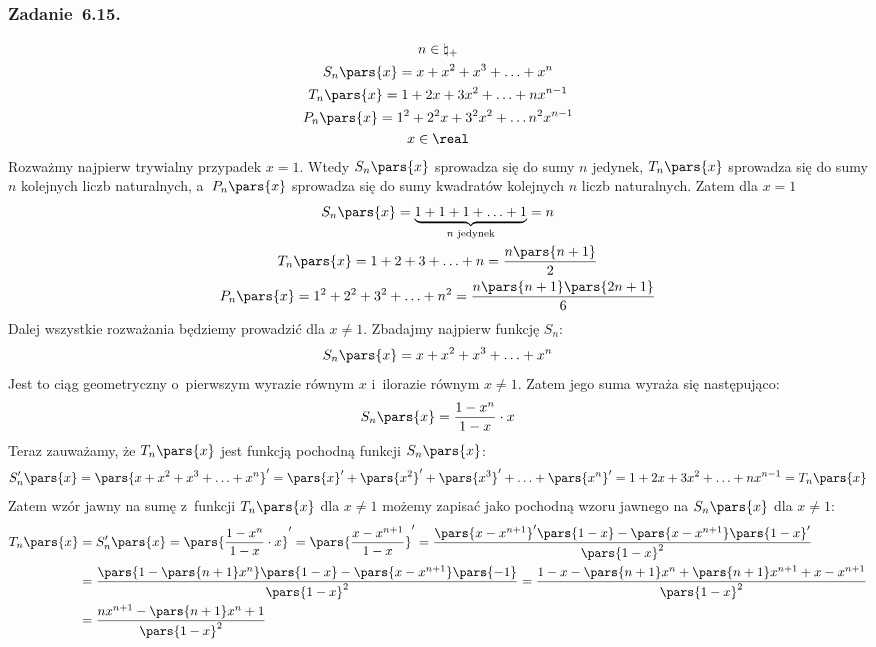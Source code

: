 \subsubsection*{Zadanie~6.15.}
\begin{gather*}
    n \in \natural_+\\
    S_n\pars{x} = x + x^2 + x^3 + \ldots + x^n\\
    T_n\pars{x} = 1 + 2x + 3x^2 + \ldots + nx^{n - 1}\\
    P_n\pars{x} = 1^2 + 2^2x + 3^2x^2 + \ldots n^2x^{n - 1}\\
    x \in \real
\end{gather*}
Rozważmy najpierw trywialny przypadek \(x = 1\). Wtedy \(S_n\pars{x}\) sprowadza się do sumy \(n\) jedynek, \(T_n\pars{x}\) sprowadza się do sumy \(n\) kolejnych liczb naturalnych, a~\(P_n\pars{x}\) sprowadza się do sumy kwadratów kolejnych \(n\) liczb naturalnych. Zatem dla \(x = 1\)
\begin{gather*}
    S_n\pars{x} = \underbrace{1 + 1 + 1 + \ldots + 1}_{n \text{ jedynek}} = n\\
    T_n\pars{x} = 1 + 2 + 3 + \ldots + n = \frac{n\pars{n + 1}}{2}\\
    P_n\pars{x} = 1^2 + 2^2 + 3^2 + \ldots + n^2 = \frac{n\pars{n + 1}\pars{2n + 1}}{6}
\end{gather*}
Dalej wszystkie rozważania będziemy prowadzić dla \(x \neq 1\). Zbadajmy najpierw funkcję \(S_n\):
\begin{equation*}
    S_n\pars{x} = x + x^2 + x^3 + \ldots + x^n
\end{equation*}
Jest to ciąg geometryczny o~pierwszym wyrazie równym \(x\) i~ilorazie równym \(x \neq 1\). Zatem jego suma wyraża się następująco:
\begin{equation*}
    S_n\pars{x} = \frac{1 - x^n}{1 - x} \cdot x
\end{equation*}
Teraz zauważamy, że \(T_n\pars{x}\) jest funkcją pochodną funkcji \(S_n\pars{x}\):
\begin{equation*}
    S_n'\pars{x}
        = \pars{x + x^2 + x^3 + \ldots + x^n}'
        = \pars{x}' + \pars{x^2}' + \pars{x^3}' + \ldots + \pars{x^n}'
        = 1 + 2x + 3x^2 + \ldots + nx^{n - 1}
        = T_n\pars{x}
\end{equation*}
Zatem wzór jawny na sumę z~funkcji \(T_n\pars{x}\) dla \(x \neq 1\) możemy zapisać jako pochodną wzoru jawnego na \(S_n\pars{x}\) dla \(x \neq 1\):
\begin{equation*}
    \begin{split}
        T_n\pars{x}
            &= S_n'\pars{x}
            = \pars{\frac{1 - x^n}{1 - x} \cdot x}'
            = \pars{\frac{x - x^{n + 1}}{1 - x}}'
            = \frac{\pars{x - x^{n + 1}}'\pars{1 - x} - \pars{x - x^{n + 1}}\pars{1 - x}'}{\pars{1 - x}^2}\\
            &= \frac{\pars{1 - \pars{n + 1}x^n}\pars{1 - x} - \pars{x - x^{n + 1}}\pars{-1}}{\pars{1 - x}^2}
            = \frac{1 - x - \pars{n + 1}x^n + \pars{n + 1}x^{n + 1} + x - x^{n + 1}}{\pars{1 - x}^2}\\
            &= \frac{nx^{n + 1} - \pars{n + 1}x^n + 1}{\pars{1 - x}^2}
    \end{split}
\end{equation*}
